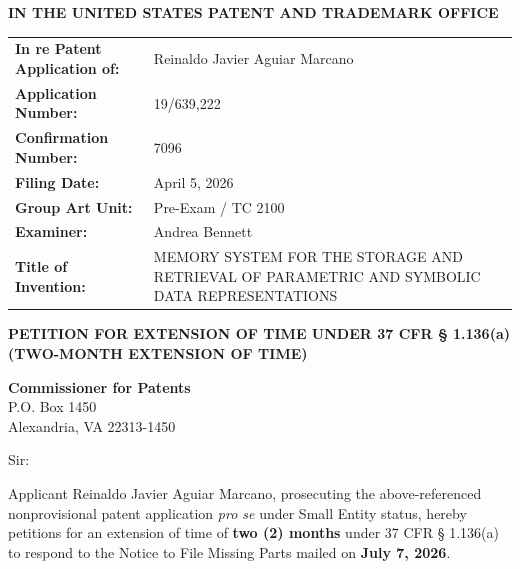 \documentclass[11pt,letterpaper]{article}
\begin{document}
\thispagestyle{empty}

\begin{center}
    \large\textbf{IN THE UNITED STATES PATENT AND TRADEMARK OFFICE} \\
\end{center}

\vspace{0.3cm}
\noindent\begin{tabular}{p{2.3in}p{4.0in}}
\textbf{In re Patent Application of:} & Reinaldo Javier Aguiar Marcano \\
\textbf{Application Number:} & 19/639,222 \\
\textbf{Confirmation Number:} & 7096 \\
\textbf{Filing Date:} & April 5, 2026 \\
\textbf{Group Art Unit:} & Pre-Exam / TC 2100 \\
\textbf{Examiner:} & Andrea Bennett \\
\textbf{Title of Invention:} & MEMORY SYSTEM FOR THE STORAGE AND RETRIEVAL OF PARAMETRIC AND SYMBOLIC DATA REPRESENTATIONS \\
\end{tabular}

\vspace{0.8cm}
\begin{center}
    \textbf{\large PETITION FOR EXTENSION OF TIME UNDER 37 CFR \S{} 1.136(a) \\
    (TWO-MONTH EXTENSION OF TIME)}
\end{center}

\vspace{0.4cm}
\noindent\textbf{Commissioner for Patents} \\
\noindent P.O. Box 1450 \\
\noindent Alexandria, VA 22313-1450

\vspace{0.4cm}
\noindent Sir:

Applicant Reinaldo Javier Aguiar Marcano, prosecuting the above-referenced nonprovisional patent application \textit{pro se} under Small Entity status, hereby petitions for an extension of time of \textbf{two (2) months} under 37 CFR \S{} 1.136(a) to respond to the Notice to File Missing Parts mailed on \textbf{July 7, 2026}.
\end{document}
